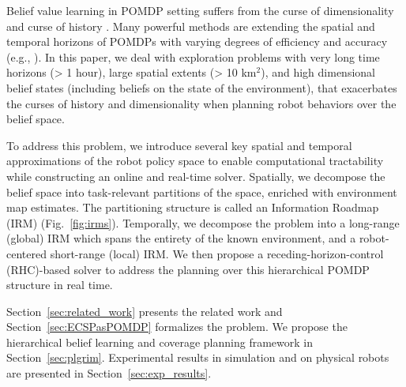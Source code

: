 \documentclass{article}
\newcommand{\ph}[1]{{\textbf{#1}:}} %
\begin{document}


Belief value learning in POMDP setting suffers from the curse of dimensionality \cite{KLC98} and curse of history \cite{Pineau03}. Many powerful methods are extending the spatial and temporal horizons of POMDPs with varying degrees of efficiency and accuracy (e.g., \cite{silver2010monte,somani2013despot,bonet1998learning,kim2019pomhdp}). In this paper, we deal with exploration problems with very long time horizons (> 1 hour), large spatial extents (> 10 km$^2$), and high dimensional belief states (including beliefs on the state of the environment), that exacerbates the curses of history and dimensionality when planning robot behaviors over the belief space.
%

To address this problem, we introduce several key spatial and temporal approximations of the robot policy space to enable computational tractability while constructing an online and real-time solver.
Spatially, we decompose the belief space into task-relevant partitions of the space,
enriched with environment map estimates. %
The partitioning structure is called an Information Roadmap (IRM) (Fig.~\ref{fig:irms}). Temporally, we decompose the problem into a long-range (global) IRM which spans the entirety of the known environment, and a robot-centered short-range (local) IRM. %
We then propose a receding-horizon-control (RHC)-based solver to address the planning over this hierarchical POMDP structure %
in real time.

Section~\ref{sec:related_work} presents the related work and Section~\ref{sec:ECSPasPOMDP} formalizes the problem.
We propose the hierarchical belief learning and coverage planning framework in Section~\ref{sec:plgrim}. Experimental results in simulation and on physical robots are presented in Section~\ref{sec:exp_results}.%
\end{document}
